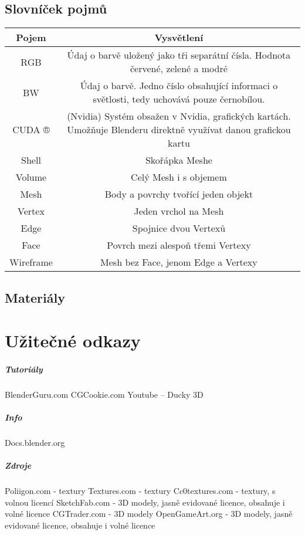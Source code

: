 \documentclass[12pt,a4paper]{report}
\begin{document}
	\section{Slovníček pojmů}
	\begin{tabular}{cc}
		\toprule
		Pojem & Vysvětlení
\\
		\midrule
		RGB & Údaj o barvě uložený jako tři
separátní čísla. Hodnota červené,
zelené a modré \\
		BW & Údaj o barvě. Jedno číslo
obsahující informaci o světlosti,
tedy uchovává pouze černobílou.
\\
		CUDA ® & (Nvidia) Systém obsažen v Nvidia,
grafických kartách. Umožňuje
Blenderu direktně využívat danou
grafickou kartu
\\
		Shell & Skořápka Meshe
\\
		Volume & Celý Mesh i s objemem
\\
		Mesh & Body a povrchy tvořící jeden
objekt
\\
		Vertex & Jeden vrchol na Mesh
\\
		Edge & Spojnice dvou Vertexů
\\
		Face & Povrch mezi alespoň třemi Vertexy
\\
		Wireframe & Mesh bez Face, jenom Edge a
Vertexy
	\end{tabular}
	
	\section{Materiály}
	
	\chapter{Užitečné odkazy}
	\paragraph{Tutoriály} \newline
	BlenderGuru.com
	CGCookie.com
	Youtube – Ducky 3D
	\paragraph{Info} \newline
	Docs.blender.org
	\paragraph{Zdroje} \newline
	Poliigon.com - textury
	Textures.com - textury
	Cc0textures.com - textury, s volnou licencí
	SketchFab.com - 3D modely, jasně evidované licence, obsahuje i volné
	licence
	CGTrader.com - 3D modely
	OpenGameArt.org - 3D modely, jasně evidované licence, obsahuje i volné
	licence
	
\end{document}
